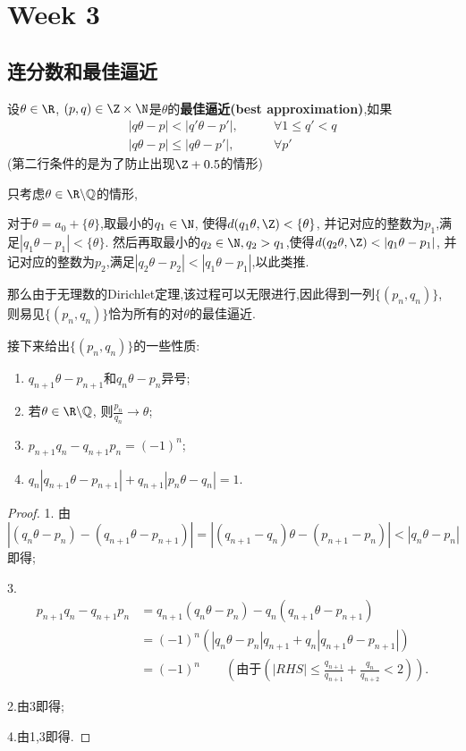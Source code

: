 \section{Week 3}
\subsection{连分数和最佳逼近}
\begin{definition}
    设$\theta \in \R$, $(p,q) \in \Z \times \N$是$\theta$的\textbf{最佳逼近(best approximation)},如果
    \begin{align}
        |q\theta - p| < |q'\theta - p'|, \qquad &\forall 1 \leq q' < q \\
        |q\theta - p| \leq |q\theta - p'|, \qquad &\forall p'
    \end{align}
    (第二行条件的是为了防止出现$\Z+0.5$的情形)
\end{definition}
只考虑$\theta \in \R \backslash \Q$的情形,

对于$\theta = a_0 + \{\theta \}$,取最小的$q_1 \in \N$, 使得$d(q_1\theta,\Z) < \{\theta \}$,
并记对应的整数为$p_1$,满足$|q_1 \theta - p_1| < \{\theta\}$.
然后再取最小的$q_2\in\N, q_2>q_1$,使得$d(q_2\theta,\Z) < |q_1\theta - p_1|$,
并记对应的整数为$p_2$,满足$|q_2\theta - p_2| < |q_1\theta - p_1|$,以此类推.

那么由于无理数的Dirichlet定理,该过程可以无限进行,因此得到一列$\{(p_n,q_n)\}$,
则易见$\{(p_n,q_n)\}$恰为所有的对$\theta$的最佳逼近.

接下来给出$\{(p_n,q_n)\}$的一些性质:

\begin{lemma}
    \begin{enumerate}
        \item $q_{n+1}\theta - p_{n+1}$和$q_n \theta - p_n$异号;
        \item 若$\theta \in \R \backslash \Q$, 则$\frac{p_n}{q_n} \to \theta$;
        \item $p_{n+1} q_n - q_{n+1} p_n = (-1)^n$;
        \item $q_n|q_{n+1} \theta - p_{n+1}| + q_{n+1}|p_n \theta - q_n| = 1$.

    \end{enumerate}
\end{lemma}
\begin{proof}
    1. 由\[|(q_n \theta - p_n) - (q_{n+1} \theta - p_{n+1})| 
    = |(q_{n+1} - q_{n}) \theta - (p_{n+1} - p_n)|  < |q_n\theta - p_n|\]即得;

    3. 
    \begin{align}
        p_{n+1}q_n - q_{n+1}p_n &= q_{n+1}(q_n \theta - p_n) - q_n(q_{n+1} \theta - p_{n+1}) \\
        &=(-1)^n(|q_n\theta - p_n| q_{n+1} + q_n|q_{n+1} \theta - p_{n+1}|) \\
        &= (-1)^n \qquad (由于(|RHS| \leq \frac{q_{n+1}}{q_{n+1}} + \frac{q_n}{q_{n+2}} < 2)).
    \end{align}

    2.由3即得;

    4.由1,3即得.
\end{proof}

